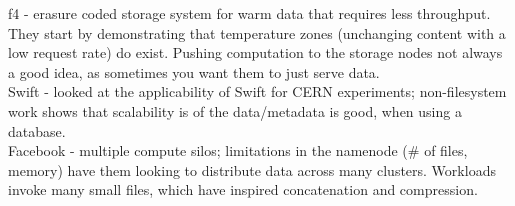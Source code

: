 \documentclass{article}
\begin{document}
\noindent\cite{muralidhar:osdi2014-f4} f4 - erasure coded storage system for warm data that requires less throughput. They start by demonstrating that temperature zones (unchanging content with a low request rate) do exist.  Pushing computation to the storage nodes not always a good idea, as sometimes you want them to just serve data.\\

\noindent\cite{toor:nas2012-swift} Swift - looked at the applicability of Swift for CERN experiments; non-filesystem work shows that scalability is of the data/metadata is good, when using a database.\\

\noindent\cite{thusoo:sigmod2010-facebook-infrastructure} Facebook - multiple compute silos; limitations in the namenode (\# of files, memory) have them looking to distribute data across many clusters. Workloads invoke many small files, which have inspired concatenation and compression. \\
\end{document}
